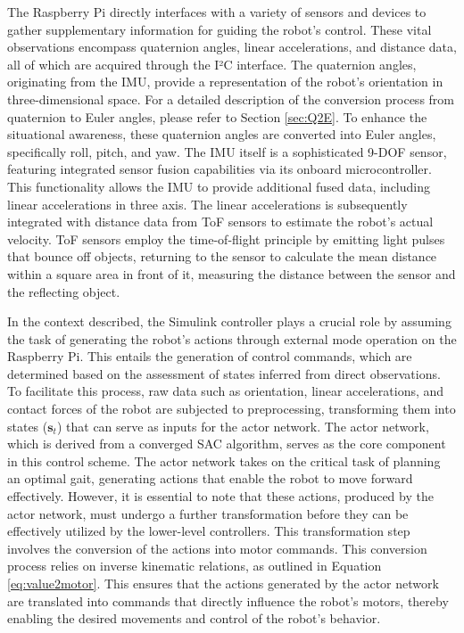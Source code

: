 The Raspberry Pi directly interfaces with a variety of sensors and devices to gather supplementary information for guiding the robot's control. These vital observations encompass quaternion angles, linear accelerations, and distance data, all of which are acquired through the \ac{I²C} interface. The quaternion angles, originating from the \ac{IMU}, provide a representation of the robot's orientation in three-dimensional space. For a detailed description of the conversion process from quaternion to Euler angles, please refer to Section \ref{sec:Q2E}. To enhance the situational awareness, these quaternion angles are converted into Euler angles, specifically roll, pitch, and yaw. The IMU itself is a sophisticated 9-DOF sensor, featuring integrated sensor fusion capabilities via its onboard microcontroller. This functionality allows the IMU to provide additional fused data, including linear accelerations in three axis. The linear accelerations is subsequently integrated with distance data from \ac{ToF} sensors to estimate the robot's actual velocity. ToF sensors employ the time-of-flight principle by emitting light pulses that bounce off objects, returning to the sensor to calculate the mean distance within a square area in front of it, measuring the distance between the sensor and the reflecting object.

In the context described, the Simulink controller plays a crucial role by assuming the task of generating the robot's actions through external mode operation on the Raspberry Pi. This entails the generation of control commands, which are determined based on the assessment of states inferred from direct observations. To facilitate this process, raw data such as orientation, linear accelerations, and contact forces of the robot are subjected to preprocessing, transforming them into states ($\mathbf{s}_t$) that can serve as inputs for the actor network. The actor network, which is derived from a converged SAC algorithm, serves as the core component in this control scheme. The actor network takes on the critical task of planning an optimal gait, generating actions that enable the robot to move forward effectively. However, it is essential to note that these actions, produced by the actor network, must undergo a further transformation before they can be effectively utilized by the lower-level controllers. This transformation step involves the conversion of the actions into motor commands. This conversion process relies on inverse kinematic relations, as outlined in Equation \ref{eq:value2motor}. This ensures that the actions generated by the actor network are translated into commands that directly influence the robot's motors, thereby enabling the desired movements and control of the robot's behavior.

